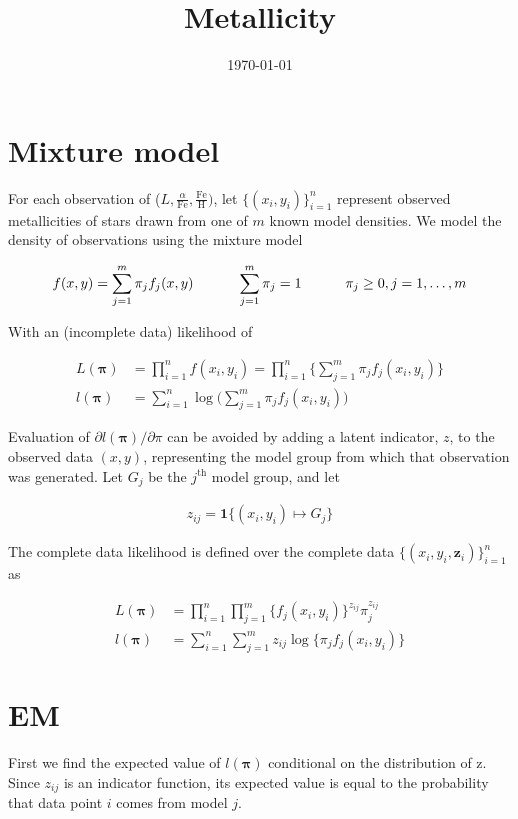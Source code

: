 \documentclass[12pt]{amsart}
\title{Metallicity}
\author{\today}
\newcommand{\vect}[1]{\boldsymbol{\mathbf{#1}}}
\newcommand{\eqn}[1]{\begin{align*}
#1
\end{align*}}
\newcommand{\shblock}{\hspace{3mm}}
\newcommand{\hblock}{\hspace{8mm}}
\newcommand{\eqnsep}{\shblock\hblock}
\newcommand{\bl}{\big\{}
\newcommand{\br}{\big\}}
\newcommand{\Bl}{\Big\{}
\newcommand{\Br}{\Big\}}
\newcommand{\indicator}{\mathbf{1}}
\newcommand{\fab}{f_j}
\newcommand{\llp}{l(\vect{\pi})}
\newcommand{\sumn}{\sum^n_{i=1}}
\newcommand{\summ}{\sum^m_{j=1}}
\begin{document}
\maketitle






\section{Mixture model}

For each observation of ($L, \frac{\alpha}{\text{Fe}}, \frac{\text{Fe}}{\text{H}})$, let $\bl (x_i,y_i) \br^n_{i=1}$ represent observed metallicities of stars drawn from one of $m$ known model densities. We model the density of observations using the mixture model

\eqn{
	f(x,y) = \summ \pi_j \fab(x,y) \eqnsep \summ \pi_j = 1 \eqnsep \pi_j \geq 0, j=1,\ldots,m
}

With an (incomplete data) likelihood of

\eqn{
	L(\vect{\pi}) &= \prod^n_{i=1} f(x_i,y_i)	 = \prod^n_{i=1} \Bl  \summ \pi_j \fab(x_i,y_i)  \Br	\\
	\llp &= \sumn \log \Big( \summ \pi_j \fab(x_i,y_i)  \Big)
}

Evaluation of $\partial l(\vect{\pi})/\partial \pi$ can be avoided by adding a latent indicator, $z$, to the observed data $(x,y)$, representing the model group from which that observation was generated. Let $G_j$ be the $j^\text{th}$ model group, and let

\eqn{z_{ij} = \indicator \bl (x_i,y_i) \mapsto G_j \br}


The complete data likelihood is defined over the complete data $\bl (x_i,y_i,\vect{z}_i) \br^n_{i=1}$ as

\eqn{
	L(\vect{\pi}) &= \prod^n_{i=1} \prod^m_{j=1} \Bl \fab(x_i,y_i) \Br ^{z_{ij}} \pi_j^{z_{ij}}	\\
	\llp &= \sumn \summ z_{ij}  \log \bl \pi_j  \fab(x_i,y_i) \br
}





\clearpage
\section{EM}

First we find the expected value of $\llp$ conditional on the distribution of z. Since $z_{ij}$ is an indicator function, its expected value is equal to the probability that data point $i$ comes from model $j$.
\end{document}
